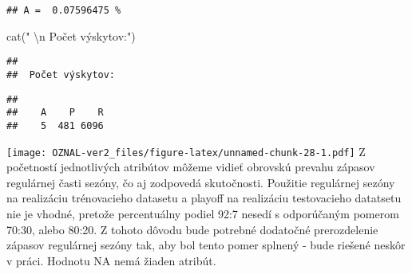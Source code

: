 \documentclass[
]{article}
\newenvironment{Shaded}{\begin{snugshade}}{\end{snugshade}}
\newcommand{\AttributeTok}[1]{\textcolor[rgb]{0.77,0.63,0.00}{#1}}
\newcommand{\DecValTok}[1]{\textcolor[rgb]{0.00,0.00,0.81}{#1}}
\newcommand{\FloatTok}[1]{\textcolor[rgb]{0.00,0.00,0.81}{#1}}
\newcommand{\FunctionTok}[1]{\textcolor[rgb]{0.00,0.00,0.00}{#1}}
\newcommand{\NormalTok}[1]{#1}
\newcommand{\SpecialCharTok}[1]{\textcolor[rgb]{0.00,0.00,0.00}{#1}}
\newcommand{\StringTok}[1]{\textcolor[rgb]{0.31,0.60,0.02}{#1}}
\begin{document}
\begin{verbatim}
## A =  0.07596475 %
\end{verbatim}

\begin{Shaded}
\begin{Highlighting}[]
\FunctionTok{cat}\NormalTok{(}\StringTok{" }\SpecialCharTok{\textbackslash{}n}\StringTok{ Počet výskytov:"}\NormalTok{)}
\end{Highlighting}
\end{Shaded}

\begin{verbatim}
##  
##  Počet výskytov:
\end{verbatim}

\begin{Shaded}
\end{Shaded}

\begin{verbatim}
## 
##    A    P    R 
##    5  481 6096
\end{verbatim}

\begin{Shaded}
\end{Shaded}

\texttt{[image: OZNAL-ver2\_files/figure-latex/unnamed-chunk-28-1.pdf]} Z
početností jednotlivých atribútov môžeme vidieť obrovskú prevahu zápasov
regulárnej časti sezóny, čo aj zodpovedá skutočnosti. Použitie
regulárnej sezóny na realizáciu trénovacieho datasetu a playoff na
realizáciu testovacieho datatsetu nie je vhodné, pretože percentuálny
podiel 92:7 nesedí s odporúčaným pomerom 70:30, alebo 80:20. Z tohoto
dôvodu bude potrebné dodatočné prerozdelenie zápasov regulárnej sezóny
tak, aby bol tento pomer splnený - bude riešené neskôr v práci. Hodnotu
NA nemá žiaden atribút.
\end{document}
